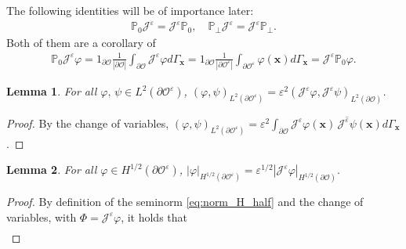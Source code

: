 \documentclass[]{article}
\newtheorem{lemma}{Lemma}
\newtheorem{proposition}{Proposition}
\numberwithin{equation}{section}
\numberwithin{theorem}{section}
\numberwithin{lemma}{section}
\numberwithin{corollary}{section}
\numberwithin{proposition}{section}
\numberwithin{definition}{section}
\newcommand{\bx}{\boldsymbol{x}}
\newcommand{\re}{\varepsilon}
\renewcommand{\O}{\mathcal{O}}
\renewcommand{\vec}{\boldsymbol}
\begin{document}
\begin{appendices}
		The following identities will be of importance later:
		\begin{align}
			\label{eq:ident}
			\mathbb{P}_0\mathcal{J}^{\re}=\mathcal{J}^{\re}\mathbb{P}_0, \quad 	\mathbb{P}_{\perp}\mathcal{J}^{\re}=\mathcal{J}^{\re}\mathbb{P}_{\perp}.
		\end{align}
		Both of them are a corollary of 
		\begin{align*}
			\mathbb{P}_0\mathcal{J}^{\re}\varphi=1_{\partial\mathcal{O}}\frac{1}{|\partial\mathcal{O}|}\int_{\partial\mathcal{O}}\mathcal{J}^{\re}\varphi d\Gamma_{\vec{x}}=1_{\partial\mathcal{O}}\frac{1}{|\partial\mathcal{O}^{\re}|}\int_{\partial\mathcal{O}^{\re}}\varphi(\vec{x}) d\Gamma_{\vec{x}}=\mathcal{J}^{\re}\mathbb{P}_0\varphi.
		\end{align*}
		\begin{lemma}
			\label{lemma:scaling_norm_l2}
			For all $\varphi,\,\psi \in L^2(\partial \mathcal{O}^{\re})$, 
			$(\varphi,\psi)_{L^2(\partial\mathcal{O}^{\re})}= \re^2 (\mathcal{J}^{\re}\varphi,\mathcal{J}^{\re}\psi)_{L^2(\partial\mathcal{O})}$.
		\end{lemma}
		\begin{proof}
			By the change of variables, $(\varphi,\psi)_{L^2(\partial\mathcal{O}^{\re})}=\re^2\int_{\partial\mathcal{O}}\mathcal{J}^{\re}\varphi(\bx) \, \overline{\mathcal{J}^{\re}\psi}(\bx) d\Gamma_{\bx}$. 
		\end{proof}	
		\begin{lemma}
			\label{lem:scaling_norm}
			For all $\varphi \in H^{1/2}(\partial \mathcal{O}^{\re})$, $
			| \varphi |_{H^{1/2}(\partial \mathcal{O}^{\re})} =  \re^{1/2} | \mathcal{J}^{\re}\varphi |_{H^{1/2}(\partial \mathcal{O})}.	$
		\end{lemma}
		\begin{proof}
			By definition of the seminorm \eqref{eq:norm_H_half} and the change of variables, with $\Phi=\mathcal{J}^{\re}\varphi$, it holds that
			\begin{align*}%

\end{align*}
\end{proof}
\end{appendices}
\end{document}
